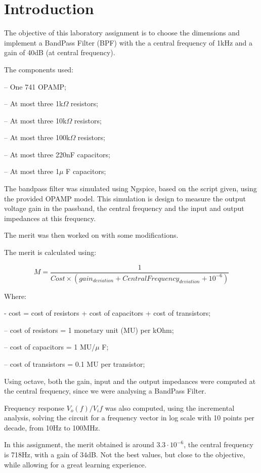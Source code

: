 \section{Introduction}
\label{sec:introduction}

The objective of this laboratory assignment is to choose the dimensions and implement a BandPass Filter (BPF) with the a central frequency of 1kHz and a gain of 40dB (at central frequency). \par
\vspace{0.5cm}
The components used:\par
– One 741 OPAMP; \par
– At most three 1k$\Omega$ resistors; \par
– At most three 10k$\Omega$  resistors; \par
– At most three 100k$\Omega$  resistors; \par
– At most three 220nF capacitors;\par
– At most three 1$\mu$ F capacitors; \par
\vspace{0.5cm}
The bandpass filter was simulated using Ngspice, based on the script given, using the provided OPAMP model. This simulation is design to measure the output voltage gain in the passband, the central frequency and the input and output impedances at this frequency. \par
The merit was then worked on with some modifications. \par
The merit is calculated using: \par
\begin{equation}
    M = \frac{1}{Cost \times (gain_{deviation} + CentralFrequency_{deviation} + 10^{-6})}
\end{equation}\par
Where:\par
- cost = cost of resistors + cost of capacitors + cost of transistors; \par
– cost of resistors = 1 monetary unit (MU) per kOhm; \par
– cost of capacitors = 1 MU/$\mu$ F; \par
– cost of transistors = 0.1 MU per transistor; \par
\vspace{0.5cm}
Using octave, both the gain, input and the output impedances were computed at the central frequency, since we were analysing a BandPass Filter. \par
Frequency response $V_{o}(f)/V_i{f}$ was also computed, using the incremental analysis, solving the circuit for a frequency vector in log scale with 10 points per decade, from 10Hz to 100MHz.\par
\par In this assignment, the merit obtained is around $3.3 \cdot 10^{-6}$, the central frequency is 718Hz, with a gain of 34dB. Not the best values, but close to the objective, while allowing for a great learning experience.\par

